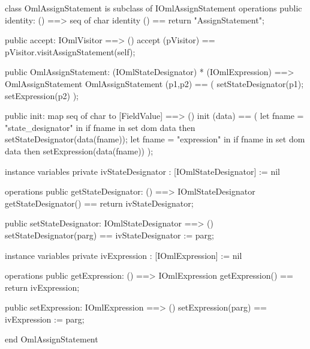 \begin{vdm_al}
class OmlAssignStatement is subclass of IOmlAssignStatement
operations
  public identity: () ==> seq of char
  identity () == return "AssignStatement";

  public accept: IOmlVisitor ==> ()
  accept (pVisitor) == pVisitor.visitAssignStatement(self);

  public OmlAssignStatement:
      (IOmlStateDesignator) *
      (IOmlExpression) ==> OmlAssignStatement
  OmlAssignStatement (p1,p2) == 
   ( setStateDesignator(p1);
     setExpression(p2) );

  public init: map seq of char to [FieldValue] ==> ()
  init (data) ==
    ( let fname = "state_designator" in
        if fname in set dom data
        then setStateDesignator(data(fname));
      let fname = "expression" in
        if fname in set dom data
        then setExpression(data(fname)) );

instance variables
  private ivStateDesignator : [IOmlStateDesignator] := nil

operations
  public getStateDesignator: () ==> IOmlStateDesignator
  getStateDesignator() == return ivStateDesignator;

  public setStateDesignator: IOmlStateDesignator ==> ()
  setStateDesignator(parg) == ivStateDesignator := parg;

instance variables
  private ivExpression : [IOmlExpression] := nil

operations
  public getExpression: () ==> IOmlExpression
  getExpression() == return ivExpression;

  public setExpression: IOmlExpression ==> ()
  setExpression(parg) == ivExpression := parg;

end OmlAssignStatement
\end{vdm_al}

